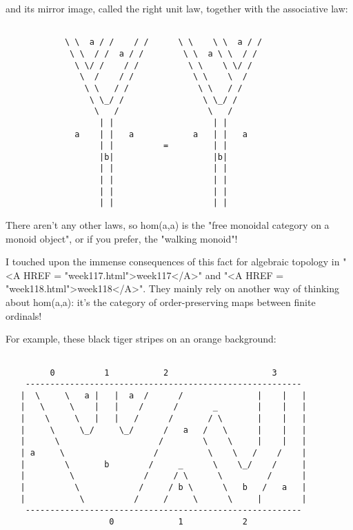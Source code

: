 and its mirror image, called the right unit law, together with the
associative law:


\begin{verbatim}

            \ \  a / /    / /      \ \    \ \  a / /
             \ \  / /  a / /        \ \  a \ \  / /
              \ \/ /    / /          \ \    \ \/ /
               \  /    / /            \ \    \  /
                \ \   / /              \ \   / /
                 \ \_/ /                \ \_/ /
                  \   /                  \   /
                   | |                    | |
              a    | |   a            a   | |   a
                   | |          =         | |
                   |b|                    |b|
                   | |                    | |
                   | |                    | |
                   | |                    | |
                   | |                    | |
\end{verbatim}
    
There aren't any other laws, so hom(a,a) is the "free monoidal
category on a monoid object", or if you prefer, the "walking
monoid"!


I touched upon the immense consequences of this fact for algebraic
topology in "<A HREF = "week117.html">week117</A>" and
"<A HREF = "week118.html">week118</A>".  They mainly rely on
another way of thinking about hom(a,a): it's the category of
order-preserving maps between finite ordinals!

For example, these black tiger stripes on an orange background:


\begin{verbatim}

         0          1           2                     3
    --------------------------------------------------------
   |  \     \   a |   |  a  /      /               |    |   |
   |   \     \    |   |    /      /       _        |    |   |
   |    \     \   |   |   /      /       / \       |    |   |
   |     \     \_/     \_/      /   a   /   \      |    |   |
   |      \                    /        \    \     |    |   |
   | a     \                  /          \    \   /    /    |
   |        \       b        /     _      \    \_/    /     |
   |         \              /     / \      \         /      |
   |          \            /     / b \      \   b   /   a   |
   |           \          /     /     \      \     |        |
    --------------------------------------------------------
                     0             1            2
\end{verbatim}
    
